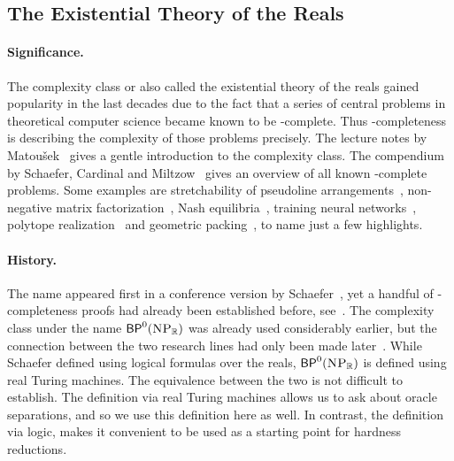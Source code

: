 \documentclass{article}
\begin{document}
\subsection{The Existential Theory of the Reals}
\label{sec:ETR}

\paragraph{Significance.}
The complexity class \ER or also called the existential theory of the reals gained popularity in the last decades due to the fact that a series of central problems in theoretical computer science became known to be \ER-complete.
Thus \ER-completeness is describing the complexity of those problems precisely.
The lecture notes by Matou\v{s}ek~\cite{M14} gives a gentle introduction to the complexity class.
The compendium by Schaefer, Cardinal and Miltzow~\cite{ERcompendium} gives an overview of all known \ER-complete problems.
Some examples are stretchability of pseudoline arrangements~\cite{S91,M88}, non-negative matrix factorization~\cite{S16}, Nash equilibria~\cite{DGP09, SS17}, training neural networks~\cite{BHJMW22, Z92,AKM21}, polytope realization~\cite{RG99} and geometric packing~\cite{AMS24}, to name just a few highlights.

\paragraph{History.}
The name appeared first in a conference version by Schaefer~\cite{S10}, yet a handful of \ER-completeness proofs 
had already been established before, see~\cite{S91,RG99, B91, KM94}.
The complexity class under the name $\mathsf{BP}^0(\textsc{NP}_\mathbb{R})$ was already used considerably earlier, but the connection between the two research lines had only been made later~\cite{ERcompendium}.
While Schaefer defined \ER using logical formulas over the reals, 
$\mathsf{BP}^0(\textsc{NP}_\mathbb{R})$ is defined using real Turing machines. 
The equivalence between the two is not difficult to establish.
The definition via real Turing machines allows us to ask about oracle separations, and so we use this definition here as well. 
In contrast, the definition via logic, makes it convenient to be used as a starting point for hardness reductions.
\end{document}
